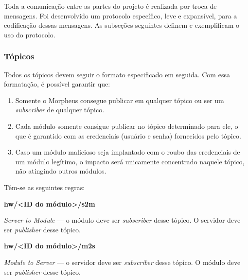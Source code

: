 Toda a comunicação entre as partes do projeto é realizada por troca de mensagens. Foi desenvolvido um protocolo específico, leve e expansível, para a codificação dessas mensagens. As subseções seguintes definem e exemplificam o uso do protocolo.

\subsubsection{Tópicos}
Todos os tópicos devem seguir o formato especificado em seguida. Com essa formatação, é possível garantir que:

\begin{enumerate}
\item Somente o Morpheus consegue publicar em qualquer tópico ou ser um \emph{subscriber} de qualquer tópico.
\item Cada módulo somente consigue publicar no tópico determinado para ele, o que é garantido com as credenciais (usuário e senha) fornecidos pelo tópico.
\item Caso um módulo malicioso seja implantado com o roubo das credenciais de um módulo legítimo, o impacto será unicamente concentrado naquele tópico, não atingindo outros módulos.
\end{enumerate}

Têm-se as seguintes regras:

\textbf{hw/\textless ID do módulo\textgreater /s2m}

\emph{Server to Module} --- o módulo deve ser \emph{subscriber} desse tópico. O servidor deve ser \emph{publisher} desse tópico.

\textbf{hw/\textless ID do módulo\textgreater /m2s}

\emph{Module to Server} --- o servidor deve ser \emph{subscriber} desse tópico. O módulo deve ser \emph{publisher} desse tópico.

